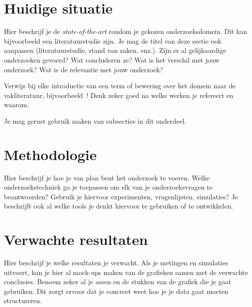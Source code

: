 
\section{Huidige situatie}
\label{sec:state-of-the-art}

Hier beschrijf je de \emph{state-of-the-art} rondom je gekozen onderzoeksdomein. Dit kan bijvoorbeeld een literatuurstudie zijn. Je mag de titel van deze sectie ook aanpassen (literatuurstudie, stand van zaken, enz.). Zijn er al gelijkaardige onderzoeken gevoerd? Wat concluderen ze? Wat is het verschil met jouw onderzoek? Wat is de relevantie met jouw onderzoek?

Verwijs bij elke introductie van een term of bewering over het domein naar de vakliteratuur, bijvoorbeeld~\autocite{Doll1954}! Denk zeker goed na welke werken je refereert en waarom.


Je mag gerust gebruik maken van subsecties in dit onderdeel.

\section{Methodologie}
\label{sec:methodologie}

Hier beschrijf je hoe je van plan bent het onderzoek te voeren. Welke onderzoekstechniek ga je toepassen om elk van je onderzoeksvragen te beantwoorden? Gebruik je hiervoor experimenten, vragenlijsten, simulaties? Je beschrijft ook al welke tools je denkt hiervoor te gebruiken of te ontwikkelen.

\section{Verwachte resultaten}
\label{sec:verwachte_resultaten}

Hier beschrijf je welke resultaten je verwacht. Als je metingen en simulaties uitvoert, kan je hier al mock-ups maken van de grafieken samen met de verwachte conclusies. Benoem zeker al je assen en de stukken van de grafiek die je gaat gebruiken. Dit zorgt ervoor dat je concreet weet hoe je je data gaat moeten structureren.


